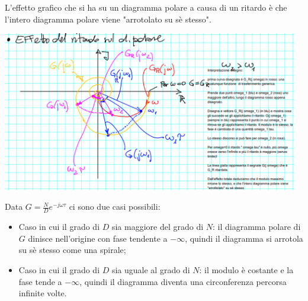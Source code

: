 \begin{itemize}
    \newline
    L'effetto grafico che si ha su un diagramma polare a causa di un ritardo è che l'intero diagramma polare viene "arrotolato su sè stesso".
    \begin{center}
        \includegraphics[height=7cm]{../lezione17/img2.PNG}
    \end{center}
    Data $G = \frac{N}{D} e^{- j \omega \tau}$ ci sono due casi possibili:
    \begin{itemize}
        \item Caso in cui il grado di $D$ sia maggiore del grado di $N$: il diagramma polare di $G$ dinisce nell'origine con fase tendente a $- \infty$, quindi il diagramma si arrotola su sè stesso come una spirale;
        \item Caso in cui il grado di $D$ sia uguale al grado di $N$: il modulo è costante e la fase tende a $- \infty$, quindi il diagramma diventa una circonferenza percorsa infinite volte.
    \end{itemize}
\end{itemize}
